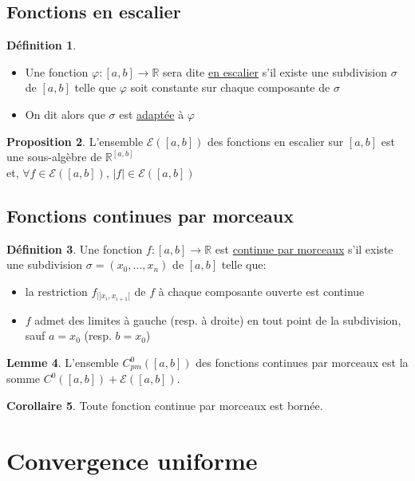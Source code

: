 \documentclass[10pt,a4paper]{article}
\theoremstyle{definition}
\newtheorem{proposition}{Proposition}[section]
\newtheorem{corollaire}[proposition]{Corollaire}
\newtheorem{lemme}[proposition]{Lemme}
\newtheorem{definition}[proposition]{Définition}
\begin{document}
\subsection{Fonctions en escalier}
\begin{definition}
\hfill
\begin{itemize}
\item Une fonction $\varphi: [a, b] \to \mathbb{R}$ sera dite \uline{en escalier} s'il existe une subdivision $\sigma$ de $[a, b]$ telle que $\varphi$ soit constante sur chaque composante de $\sigma$
\item On dit alors que $\sigma$ est \uline{adaptée} à $\varphi$
\end{itemize}
\end{definition}
\begin{proposition}
L'ensemble $\mathcal{E}([a, b])$ des fonctions en escalier sur $[a, b]$ est une sous-algèbre de $\mathbb{R}^{[a, b]}$ \\
et, $\forall f \in \mathcal{E}([a, b])$, $|f| \in \mathcal{E}([a, b])$
\end{proposition}

\subsection{Fonctions continues par morceaux}
\begin{definition}
Une fonction $f: [a,b] \to \mathbb{R}$ est \uline{continue par morceaux} s'il existe une subdivision $\sigma = (x_{0}, ... ,x_{n})$ de $[a, b]$ telle que:
\begin{itemize}
\item la restriction $f_{|]x_{i}, x_{i+1}[}$ de $f$ à chaque composante ouverte est continue
\item $f$ admet des limites à gauche (resp. à droite) en tout point de la subdivision, sauf $a = x_{0}$ (resp. $b = x_{0}$)
\end{itemize}
\end{definition}
\begin{lemme}
L'ensemble $C^{0}_{pm}([a, b])$ des fonctions continues par morceaux est la somme $C^{0}([a, b]) + \mathcal{E}([a, b])$.
\end{lemme}
\begin{corollaire}
Toute fonction continue par morceaux est bornée.
\end{corollaire}

\section{Convergence uniforme}
\end{document}
